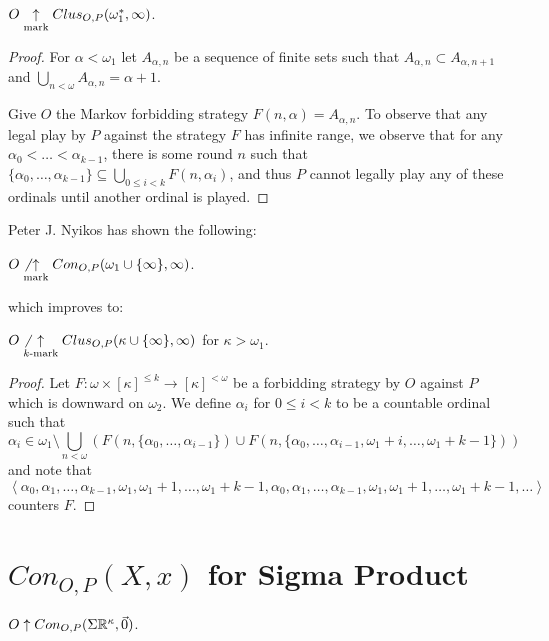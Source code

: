 \begin{theorem}
$O\underset{\text{mark}}{\uparrow} Clus_{O,P}(\omega_1^*,\infty)$.
\end{theorem}

\begin{proof}
For $\alpha<\omega_1$ let $A_{\alpha,n}$ be a sequence of finite sets such that $A_{\alpha,n}\subset A_{\alpha,n+1}$ and $\bigcup_{n<\omega}A_{\alpha,n}=\alpha+1$.

Give $O$ the Markov forbidding strategy $F(n,\alpha)=A_{\alpha,n}$. To observe that any legal play by $P$ against the strategy $F$ has infinite range, we observe that for any $\alpha_0<\dots<\alpha_{k-1}$, there is some round $n$ such that $\{\alpha_0,\dots,\alpha_{k-1}\}\subseteq \bigcup_{0\leq i < k}F(n,\alpha_i)$, and thus $P$ cannot legally play any of these ordinals until another ordinal is played.
\end{proof}

Peter J. Nyikos has shown the following:

\begin{theorem}
$O\not\underset{\text{mark}}{\uparrow} Con_{O,P}(\omega_1\cup\{\infty\},\infty)$.
\end{theorem}

which improves to:

\begin{theorem}
$O\not\underset{k\text{-mark}}{\uparrow}Clus_{O,P}(\kappa\cup\{\infty\},\infty)$ for $\kappa>\omega_1$.
\end{theorem}

\begin{proof}
Let $F:\omega \times [\kappa]^{\leq k} \to [\kappa]^{<\omega}$ be a forbidding strategy by $O$ against $P$ which is downward on $\omega_2$. We define $\alpha_i$ for $0\leq i < k$ to be a countable ordinal such that \[ \alpha_i \in \omega_1 \setminus\bigcup_{n<\omega}\left(F(n,\{\alpha_0,\dots,\alpha_{i-1}\}) \cup F(n,\{\alpha_0,\dots,\alpha_{i-1},\omega_1+i,\dots,\omega_1+k-1\})\right)\] and note that \[\left<\alpha_0,\alpha_1,\dots,\alpha_{k-1},\omega_1,\omega_1+1,\dots,\omega_1+k-1,\alpha_0,\alpha_1,\dots,\alpha_{k-1},\omega_1,\omega_1+1,\dots,\omega_1+k-1,\dots\right>\] counters $F$.
\end{proof}

\section{$Con_{O,P}(X,x)$ for Sigma Product}

\begin{proposition}
$O\uparrow Con_{O,P}(\Sigma\mathbb{R}^{\kappa},\vec{0})$.
\end{proposition}

